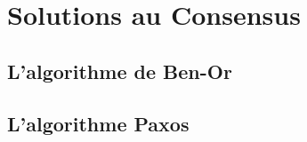 \documentclass[9pt, handout]{beamer}
\begin{document}
\section{Solutions au Consensus}
 
\subsection{L'algorithme de Ben-Or}







 
\subsection{L'algorithme Paxos}





\end{document}
